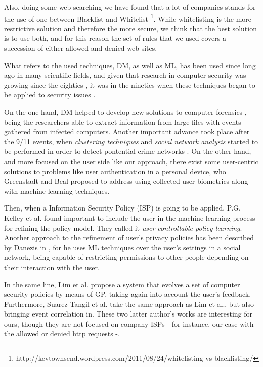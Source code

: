 \documentclass{llncs}
\begin{document}
Also, doing some web searching we have found that a lot of companies stands for the use of one between Blacklist and Whitelist \footnote{http://kevtownsend.wordpress.com/2011/08/24/whitelisting-vs-blacklisting/}. While whitelisting is the more restrictive solution and therefore the more secure, we think that the best solution is to use both, and for this reason the set of rules that we used covers a succession of either allowed and denied web sites.

What refers to the used techniques, DM, as well as ML, has been used since long ago in many scientific fields,
and given that research in computer security was growing since the
eighties \cite{computer_security_80}, it was in the nineties
when these techniques began to be applied to security issues
\cite{Clifton1996}. 

On the one hand, DM helped to develop new solutions to computer forensics \cite{DeVel2001}, being the researchers able to extract information from large files with events gathered from infected computers. Another important advance took place after the 9/11 events, when \textit{clustering techniques} and \textit{social network analysis} started to be performed in order to detect pontential crime networks \cite{Hsinchun2003}.
On the other hand, and more focused on the user side like our approach, there exist some user-centric solutions to problems like user authentication in a personal device, who Greenstadt and Beal \cite{cognitive_security_08} proposed to address using collected user biometrics along with machine learning techniques.
 
Then, when a Information Security Policy (ISP) is going to be applied, P.G. Kelley et al. \cite{user-controllable_learning_08} found important to include the user in the machine learning process for refining the policy model. They called it \textit{user-controllable policy learning}. Another approach to the refinement of user's privacy policies has been described by Danezis in \cite{inferring_policies_socialnetworks_09}, for he uses ML techniques over the user's settings in a social network, being capable of restricting permissions to other people depending on their interaction with the user.

In the same line, Lim et al. propose a system \cite{sec_policy_evolution_gp_08,pol_evol_gp_3_approaches_08} that evolves a set of computer security policies by means of GP, taking again into account the user's feedback. Furthermore, Suarez-Tangil et al. \cite{rule_generation_gp_09} take the same approach as Lim et al., but also bringing event correlation in. These two latter author's works are interesting for ours, though they are not focused on company ISPs - for instance, our case with the allowed or denied http requests -.
\end{document}
